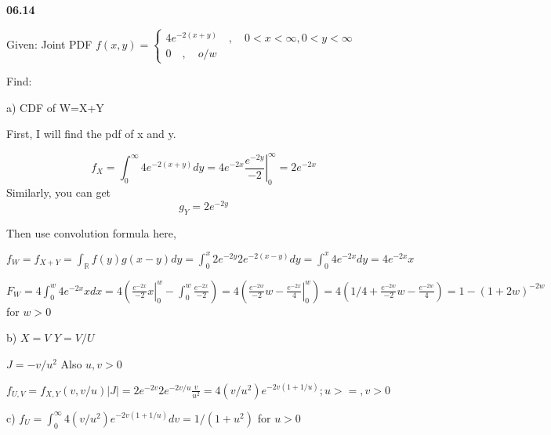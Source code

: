 {\bf 06.14}


{Given: Joint PDF $f(x,y)=\begin{cases} 4{ e }^{ -2(x+y) }\quad ,\quad 0<x<\infty ,0<y<\infty  \\ 0\quad ,\quad o/w \end{cases}$

Find: 

a) CDF of W=X+Y}

First, I will find the pdf of x and y. 

$$f_{X}=\int_{0}^{\infty} 4e^{-2(x+y)} dy= \left. 4e^{-2x}\frac{e^{-2y}}{-2}\right|_0^{\infty}=2e^{-2x}$$
Similarly, you can get $$g_{Y}=2e^{-2y}$$

Then use convolution formula here,

$f_{W}=f_{X+Y}=\int_{\mathbb{R} } f(y)g(x-y)dy=\int_{0}^{x} 2e^{-2y} 2e^{-2(x-y)}dy=\int_{0}^{x} 4e^{-2x}dy=4e^{-2x}x$

$F_{W}=4\int_{0}^{w} 4e^{-2x}x dx =4(\left. \frac{e^{-2x}}{-2} x\right|_0^{w}- \int_{0}^{w} \frac{e^{-2x}}{-2})=4( \frac{e^{-2w}}{-2}w-  \left. \frac{e^{-2x}}{4}\right|_0^{w})=4(1/4+ \frac{e^{-2w}}{-2}w-\frac{e^{-2w}}{4})=1-(1+2w)^{-2w}$ for $w>0$

b)
$X=V$ $Y=V/U$ 

$J=-v/u^2$
Also $u,v>0$ 

$f_{U,V}=f_{X,Y}(v,v/u)|J|=2e^{-2v}2e^{-2v/u} \frac{v}{u^2}=4(v/u^2)e^{-2v(1+1/u)};u>=,v>0$

c) 
$f_{U}=\int_{0}^{\infty} 4(v/u^2)e^{-2v(1+1/u)} dv=1/(1+u^2) $ for $ u>0$
